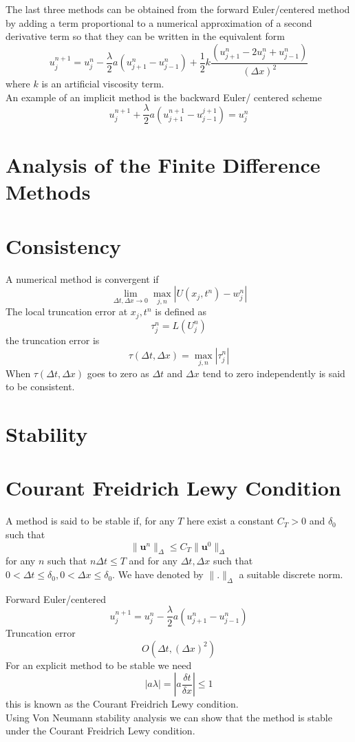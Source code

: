 The last three methods can be obtained from the forward Euler/centered method by
adding a term proportional to a numerical approximation of a second derivative term so that they can be written in the equivalent form
\[ u^{n+1}_j=u^{n}_{j}-\frac{\lambda}{2}a(u^{n}_{j+1}-u^{n}_{j-1})+\frac{1}{2}k\frac{(u^{n}_{j+1}-2u_{j}^n+u^{n}_{j-1})}{(\Delta x)^2}\]
where $k$ is an artificial viscosity term.\\
An example of an implicit method is the backward Euler/ centered scheme
\[u^{n+1}_j+\frac{\lambda}{2}a(u_{j+1}^{n+1} - u_{j-1}^{j+1})=u_{j}^n \]

\section{Analysis of the Finite Difference Methods}
\section{Consistency}
A numerical method is convergent if 
\[\lim_{\Delta t,\Delta x \rightarrow 0} \max_{j,n}|U(x_j,t^n)-w_j^n| \] 
The local truncation error at $x_j,t^n$ is defined as
\[\tau_j^n = L(U^n_j) \]
the truncation error is 
\[\tau(\Delta t, \Delta x) = \max_{j,n}|\tau^n_j| \]
When $\tau(\Delta t, \Delta x)$ goes to zero as $\Delta t$ and $\Delta x$ tend to
zero independently is said to be consistent.
\section{Stability}
\section{Courant Freidrich Lewy Condition}
A method is said to be stable if, for any $T$ here exist a constant $C_T>0$
and $\delta_0$ such that
\[\lVert  \mathbf{u}^n \rVert_{\Delta}\leq C_T \lVert \mathbf{u}^0\rVert_{\Delta} \]
for any $n$ such that $n\Delta t \leq T$ and for any $\Delta t, \Delta x$ such that $0 < \Delta t \leq \delta_0,0 < \Delta x \leq \delta_0$. We have denoted by
$ 
\lVert  . \rVert_{\Delta}$ a suitable discrete norm.

Forward Euler/centered
\[ u^{n+1}_j=u^{n}_{j}-\frac{\lambda}{2}a(u^{n}_{j+1}-u^{n}_{j-1})\]
Truncation error
\[O(\Delta t , (\Delta x)^2) \]
For an explicit method to be stable we need
\[|a\lambda| = \left|a\frac{\delta t}{\delta x}\right| \leq 1 \]
this is known as the Courant Freidrich Lewy condition.\\
Using  Von Neumann stability analysis we can show that the method is stable
under the Courant Freidrich Lewy condition.\\

